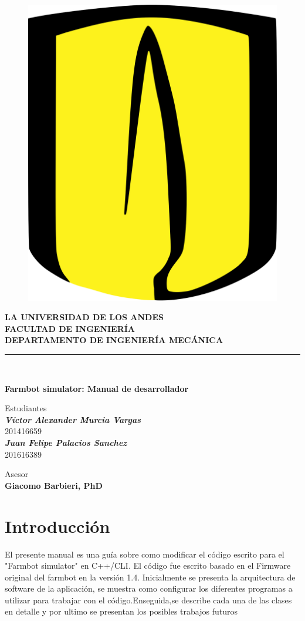 \documentclass[letterpaper,12pt]{article}
\begin{document}
	\begin{titlepage}
		\begin{center}
			\begin{figure}
				\centering
				\includegraphics[width=0.1\linewidth]{1200px-University_of_Los_Andes_logo.png}
				\label{fig:1200px-universityoflosandeslogo}
			\end{figure}
			\textbf{LA UNIVERSIDAD DE LOS ANDES}\\
			\textbf{FACULTAD DE INGENIERÍA}\\
			\textbf{DEPARTAMENTO DE INGENIERÍA MECÁNICA}\\
			\rule{80mm}{0.1mm}\\
			\vspace*{40mm}
			
			
			\vspace*{10mm}
			
			\begin{large}
				\textbf{Farmbot simulator: Manual de desarrollador}\\
			\end{large}
			
			
			\vspace*{30mm}
			Estudiantes\\
			\textbf{\textit{Víctor Alexander Murcia Vargas}}\\
			201416659\\
			
			\textbf{\textit{Juan Felipe Palacios Sanchez}}\\
			201616389\\
			
			\vspace*{30mm}
			
			Asesor\\
			\textbf{Giacomo Barbieri, PhD}		
		\end{center}
	\end{titlepage}
	\tableofcontents
	\newpage
	
	\section{Introducción}
	El presente manual es una guía sobre como modificar el código escrito para el "Farmbot simulator" en C++/CLI. El código fue escrito basado en el Firmware original del farmbot en la versión 1.4. Inicialmente se presenta la arquitectura de software de la aplicación, se muestra como configurar los diferentes programas a utilizar para trabajar con el código.Enseguida,se describe cada una de las clases en detalle y por ultimo se presentan  los posibles trabajos futuros
	
\end{document}
